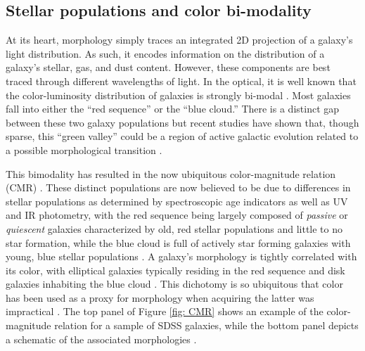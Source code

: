 \subsection{Stellar populations and color bi-modality}
\label{sec: stellar populations}

At its heart, morphology simply traces an integrated 2D projection of a galaxy's light distribution. As such, it encodes information on the distribution of a galaxy's stellar, gas, and dust content. However, these components are best traced through different wavelengths of light. In the optical, it is well known that the color-luminosity distribution of galaxies is strongly bi-modal \citep{Baldry2004b}. Most galaxies fall into either the ``red sequence'' or the ``blue cloud.'' There is a distinct gap between these two galaxy populations but recent studies have shown that, though sparse, this ``green valley'' could be a region of active galactic evolution related to a possible morphological transition \citep{Schawinski2007}.

This bimodality has resulted in the now ubiquitous color-magnitude relation (CMR) \citep{Baldry2004a, Bell2004}. These distinct populations are now believed to be due to differences in stellar populations as determined by spectroscopic age indicators as well as UV and IR photometry, with the red sequence being largely composed of \textit{passive} or \textit{quiescent} galaxies characterized by old, red stellar populations and little to no star formation, while the blue cloud is full of actively star forming galaxies with young, blue stellar populations \citep{Brinchmann2004,Kauffman2003,Salim2007,Schiminovich2007}. A galaxy's morphology is tightly correlated with its color, with elliptical galaxies typically residing in the red sequence and disk galaxies inhabiting the blue cloud \citep[e.g.,][]{Strateva2001,Baldry2004b, Cirasuolo2007, Lee2013, Taylor2015}.  This dichotomy is so ubiquitous that color has been used as a proxy for morphology when acquiring the latter was impractical \citep[e.g.,][]{Shen2003, Blanton2003c}.  The top panel of Figure \ref{fig: CMR} shows an example of the color-magnitude relation for a sample of SDSS galaxies, while the bottom panel depicts a schematic of the associated morphologies \citep[adapted from][]{Kormendy2012}. 



